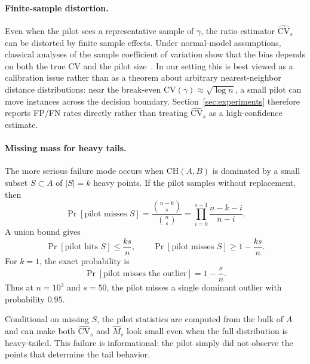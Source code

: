 \documentclass[conference]{IEEEtran}
\begin{document}
\paragraph{Finite-sample distortion.}
Even when the pilot sees a representative sample of $\gamma$, the
ratio estimator $\widehat{\mathrm{CV}}_s$ can be distorted by finite
sample effects. Under normal-model assumptions, classical analyses of
the sample coefficient of variation show that the bias depends on both
the true CV and the pilot size~\cite{mckay1932,vangel1996}. In our
setting this is best viewed as
a calibration issue rather than as a theorem about arbitrary
nearest-neighbor distance distributions: near the break-even
$\mathrm{CV}(\gamma)\approx\sqrt{\log n}$, a small pilot can move
instances across the decision boundary. Section~\ref{sec:experiments}
therefore reports FP/FN rates directly rather than treating
$\widehat{\mathrm{CV}}_s$ as a high-confidence estimate.

\paragraph{Missing mass for heavy tails.}
The more serious failure mode occurs when
$\mathrm{CH}(A,B)$ is dominated by a small subset
$S\subset A$ of $|S|=k$ heavy points. If the pilot samples without
replacement, then
\begin{equation}
\Pr[\text{pilot misses }S]
=
\frac{\binom{n-k}{s}}{\binom{n}{s}}
=
\prod_{i=0}^{s-1}
\frac{n-k-i}{n-i}.
\label{eq:missing-mass-exact}
\end{equation}
A union bound gives
\begin{equation}
    \Pr[\text{pilot hits }S]
    \leq
    \frac{ks}{n},
    \qquad
    \Pr[\text{pilot misses }S]
    \geq
    1-\frac{ks}{n}.
\label{eq:missing-mass-lower}
\end{equation}
For $k=1$, the exact probability is
\begin{equation}
    \Pr[\text{pilot misses the outlier}]
    =
    1-\frac{s}{n}.
\label{eq:single-outlier-miss}
\end{equation}
Thus at $n=10^3$ and $s=50$, the pilot misses a single dominant
outlier with probability $0.95$.

Conditional on missing $S$, the pilot statistics are computed from the
bulk of $A$ and can make both $\widehat{\mathrm{CV}}_s$ and
$\widehat{M}_s$ look small even when the full distribution is
heavy-tailed. This failure is informational: the pilot simply did not
observe the points that determine the tail behavior.
\end{document}

